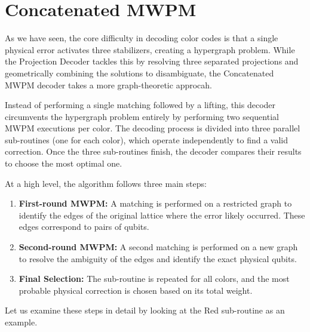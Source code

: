 \section{Concatenated MWPM}
\label{sec:concatenated_mwpm}

As we have seen, the core difficulty in decoding color codes is that a single physical error activates three stabilizers, creating a hypergraph problem. While the Projection Decoder tackles this by resolving three separated projections and geometrically combining the solutions to disambiguate, the Concatenated MWPM decoder \cite{Lee_2025} takes a more graph-theoretic approcah. 

 Instead of performing a single matching followed by a lifting, this decoder circumvents the hypergraph problem entirely by performing two sequential MWPM executions per color. The decoding process is divided into three parallel sub-routines (one for each color), which operate independently to find a valid correction. Once the three sub-routines finish, the decoder compares their results to choose the most optimal one. 

At a high level, the algorithm follows three main steps:
\begin{enumerate}
    \item \textbf{First-round MWPM:} A matching is performed on a restricted graph to identify the edges of the original lattice where the error likely occurred. These edges correspond to pairs of qubits.
    \item \textbf{Second-round MWPM:} A second matching is performed on a new graph to resolve the ambiguity of the edges and identify the exact physical qubits.
    \item \textbf{Final Selection:} The sub-routine is repeated for all colors, and the most probable physical correction is chosen based on its total weight.
\end{enumerate}

Let us examine these steps in detail by looking at the Red sub-routine as an example.

